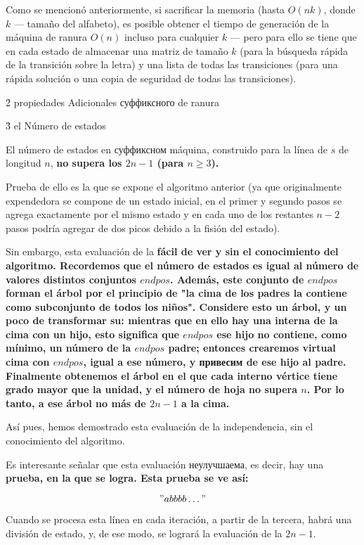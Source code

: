 Como se mencionó anteriormente, si sacrificar la memoria (hasta $O (n k)$, donde $k$ --- tamaño del alfabeto), es posible obtener el tiempo de generación de la máquina de ranura $O (n)$ incluso para cualquier $k$ --- pero para ello se tiene que en cada estado de almacenar una matriz de tamaño $k$ (para la búsqueda rápida de la transición sobre la letra) y una lista de todas las transiciones (para una rápida solución o una copia de seguridad de todas las transiciones).



\h2{ propiedades Adicionales суффиксного de ranura }


\h3{ el Número de estados }

El número de estados en суффиксном máquina, construido para la línea de $s$ de longitud $n$, \bf{no supera los $2n-1$} (para $n \ge 3$).

Prueba de ello es la que se expone el algoritmo anterior (ya que originalmente expendedora se compone de un estado inicial, en el primer y segundo pasos se agrega exactamente por el mismo estado y en cada uno de los restantes $n-2$ pasos podría agregar de dos picos debido a la fisión del estado).

Sin embargo, esta evaluación de la \bf{fácil de ver y sin el conocimiento del algoritmo}. Recordemos que el número de estados es igual al número de valores distintos conjuntos $endpos$. Además, este conjunto de $endpos$ forman el árbol por el principio de "la cima de los padres la contiene como subconjunto de todos los niños". Considere esto un árbol, y un poco de transformar su: mientras que en ello hay una interna de la cima con un hijo, esto significa que $endpos$ ese hijo no contiene, como mínimo, un número de la $endpos$ padre; entonces crearemos virtual cima con $endpos$, igual a ese número, y привесим de ese hijo al padre. Finalmente obtenemos el árbol en el que cada interno vértice tiene grado mayor que la unidad, y el número de hoja no supera $n$. Por lo tanto, a ese árbol no más de $2n-1$ a la cima.

Así pues, hemos demostrado esta evaluación de la independencia, sin el conocimiento del algoritmo.

Es interesante señalar que esta evaluación неулучшаема, es decir, hay una \bf{prueba, en la que se logra}. Esta prueba se ve así:

$$ "abbbb \ldots" $$

Cuando se procesa esta línea en cada iteración, a partir de la tercera, habrá una división de estado, y, de ese modo, se logrará la evaluación de la $2n-1$.


